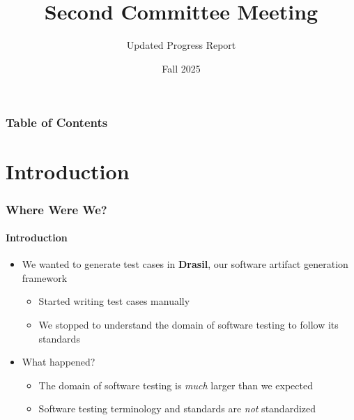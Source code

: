 \documentclass{beamer}
\title[Committee Meeting 2]{Second Committee Meeting}
\subtitle{Updated Progress Report}
\author{\thesisAuthorName{}}
\institute{McMaster University}
\date{Fall 2025}
\begin{document}

\frame{\titlepage}


\begin{frame}
    \frametitle{Table of Contents}
    \tableofcontents
\end{frame}

\section{Introduction}

\begin{frame}
    \frametitle{Where Were We?}
    \framesubtitle{Introduction}
    \begin{itemize}
        \item We wanted to generate test cases in \textbf{Drasil}, our software
              artifact generation framework
              \begin{itemize}
                  \item Started writing test cases manually
                  \item<2-> We stopped to understand the domain of software
                        testing to follow its standards
              \end{itemize}

        \item<3-> What happened?
              \begin{itemize}
                  \item The domain of software testing is \emph{much} larger than we expected
                  \item Software testing terminology and standards are \emph{not} standardized
              \end{itemize}
    \end{itemize}
\end{frame}
\end{document}
